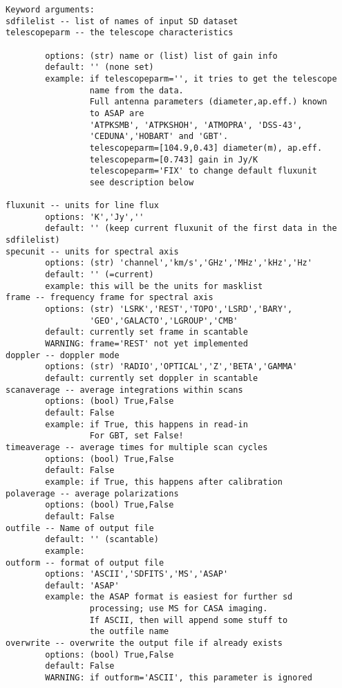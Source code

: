\begin{verbatim}
Keyword arguments:
sdfilelist -- list of names of input SD dataset
telescopeparm -- the telescope characteristics

        options: (str) name or (list) list of gain info
        default: '' (none set)
        example: if telescopeparm='', it tries to get the telescope
                 name from the data.
                 Full antenna parameters (diameter,ap.eff.) known
                 to ASAP are
                 'ATPKSMB', 'ATPKSHOH', 'ATMOPRA', 'DSS-43',
                 'CEDUNA','HOBART' and 'GBT'.
                 telescopeparm=[104.9,0.43] diameter(m), ap.eff.
                 telescopeparm=[0.743] gain in Jy/K
                 telescopeparm='FIX' to change default fluxunit
                 see description below

fluxunit -- units for line flux
        options: 'K','Jy',''
        default: '' (keep current fluxunit of the first data in the sdfilelist)
specunit -- units for spectral axis
        options: (str) 'channel','km/s','GHz','MHz','kHz','Hz'
        default: '' (=current)
        example: this will be the units for masklist
frame -- frequency frame for spectral axis
        options: (str) 'LSRK','REST','TOPO','LSRD','BARY',
                 'GEO','GALACTO','LGROUP','CMB'
        default: currently set frame in scantable
        WARNING: frame='REST' not yet implemented
doppler -- doppler mode
        options: (str) 'RADIO','OPTICAL','Z','BETA','GAMMA'
        default: currently set doppler in scantable
scanaverage -- average integrations within scans
        options: (bool) True,False
        default: False
        example: if True, this happens in read-in
                 For GBT, set False!
timeaverage -- average times for multiple scan cycles
        options: (bool) True,False
        default: False
        example: if True, this happens after calibration
polaverage -- average polarizations
        options: (bool) True,False
        default: False
outfile -- Name of output file
        default: '' (scantable)
        example:
outform -- format of output file
        options: 'ASCII','SDFITS','MS','ASAP'
        default: 'ASAP'
        example: the ASAP format is easiest for further sd
                 processing; use MS for CASA imaging.
                 If ASCII, then will append some stuff to
                 the outfile name
overwrite -- overwrite the output file if already exists
        options: (bool) True,False
        default: False
        WARNING: if outform='ASCII', this parameter is ignored
\end{verbatim}

